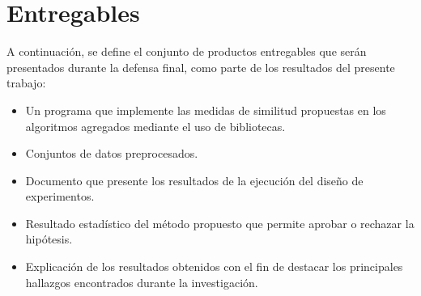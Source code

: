 \section{Entregables}\label{deliverables-section}
A continuación, se define el conjunto de productos entregables que serán presentados durante la defensa final, como parte de los resultados del presente trabajo:
\begin{itemize}
\item Un programa que implemente las medidas de similitud propuestas en los algoritmos agregados mediante el uso de bibliotecas.
\item Conjuntos de datos preprocesados.
\item Documento que presente los resultados de la ejecución del diseño de experimentos.
\item Resultado estadístico del método propuesto que permite aprobar o rechazar la hipótesis.
\item Explicación de los resultados obtenidos con el fin de destacar los principales hallazgos encontrados durante la investigación.
\end{itemize}

